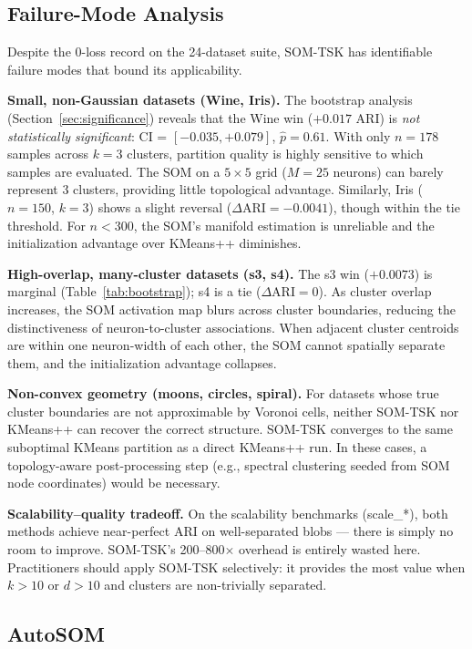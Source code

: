 \documentclass[journal]{IEEEtran}
\begin{document}
\subsection{Failure-Mode Analysis}
\label{sec:failure_modes}

Despite the 0-loss record on the 24-dataset suite, SOM-TSK has identifiable failure modes that bound its applicability.

\textbf{Small, non-Gaussian datasets (Wine, Iris).} The bootstrap analysis (Section~\ref{sec:significance}) reveals that the Wine win ($+0.017$ ARI) is \emph{not statistically significant}: CI = $[-0.035, +0.079]$, $\hat{p}=0.61$. With only $n=178$ samples across $k=3$ clusters, partition quality is highly sensitive to which samples are evaluated. The SOM on a $5\times5$ grid ($M=25$ neurons) can barely represent 3 clusters, providing little topological advantage. Similarly, Iris ($n=150$, $k=3$) shows a slight reversal ($\Delta\mathrm{ARI} = -0.0041$), though within the tie threshold. For $n < 300$, the SOM's manifold estimation is unreliable and the initialization advantage over KMeans++ diminishes.

\textbf{High-overlap, many-cluster datasets (s3, s4).} The s3 win ($+0.0073$) is marginal (Table~\ref{tab:bootstrap}); s4 is a tie ($\Delta\mathrm{ARI}=0$). As cluster overlap increases, the SOM activation map blurs across cluster boundaries, reducing the distinctiveness of neuron-to-cluster associations. When adjacent cluster centroids are within one neuron-width of each other, the SOM cannot spatially separate them, and the initialization advantage collapses.

\textbf{Non-convex geometry (moons, circles, spiral).} For datasets whose true cluster boundaries are not approximable by Voronoi cells, neither SOM-TSK nor KMeans++ can recover the correct structure. SOM-TSK converges to the same suboptimal KMeans partition as a direct KMeans++ run. In these cases, a topology-aware post-processing step (e.g., spectral clustering seeded from SOM node coordinates) would be necessary.

\textbf{Scalability--quality tradeoff.} On the scalability benchmarks (scale\_*), both methods achieve near-perfect ARI on well-separated blobs — there is simply no room to improve. SOM-TSK's 200--800$\times$ overhead is entirely wasted here. Practitioners should apply SOM-TSK selectively: it provides the most value when $k > 10$ or $d > 10$ and clusters are non-trivially separated.

\subsection{AutoSOM}
\end{document}
